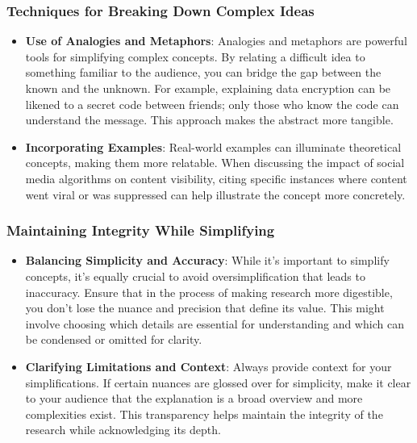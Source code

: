 \documentclass[
]{book}
\begin{document}
\hypertarget{techniques-for-breaking-down-complex-ideas}{%
\subsubsection*{Techniques for Breaking Down Complex Ideas}\label{techniques-for-breaking-down-complex-ideas}}

\begin{itemize}
\item
  \textbf{Use of Analogies and Metaphors}: Analogies and metaphors are powerful tools for simplifying complex concepts. By relating a difficult idea to something familiar to the audience, you can bridge the gap between the known and the unknown. For example, explaining data encryption can be likened to a secret code between friends; only those who know the code can understand the message. This approach makes the abstract more tangible.
\item
  \textbf{Incorporating Examples}: Real-world examples can illuminate theoretical concepts, making them more relatable. When discussing the impact of social media algorithms on content visibility, citing specific instances where content went viral or was suppressed can help illustrate the concept more concretely.
\end{itemize}

\hypertarget{maintaining-integrity-while-simplifying}{%
\subsubsection*{Maintaining Integrity While Simplifying}\label{maintaining-integrity-while-simplifying}}

\begin{itemize}
\item
  \textbf{Balancing Simplicity and Accuracy}: While it's important to simplify concepts, it's equally crucial to avoid oversimplification that leads to inaccuracy. Ensure that in the process of making research more digestible, you don't lose the nuance and precision that define its value. This might involve choosing which details are essential for understanding and which can be condensed or omitted for clarity.
\item
  \textbf{Clarifying Limitations and Context}: Always provide context for your simplifications. If certain nuances are glossed over for simplicity, make it clear to your audience that the explanation is a broad overview and more complexities exist. This transparency helps maintain the integrity of the research while acknowledging its depth.
\end{itemize}
\end{document}
